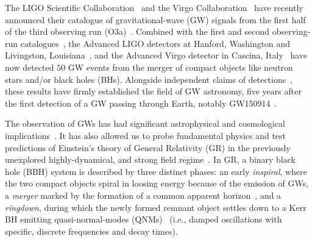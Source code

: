 
The LIGO Scientific Collaboration~\citep{lsc} and the Virgo
Collaboration~\citep{Virgo} have recently announced their catalogue of
gravitational-wave (GW) signals from the first
half of the third observing run (O3a)~\cite{Abbott:2020niy}. Combined
with the first and second observing-run catalogues~\cite{LIGOScientific:2018mvr}, the Advanced LIGO detectors at Hanford,
Washington and Livingston, Louisiana~\citep{aasi2015characterization},
and the Advanced Virgo detector in Cascina,
Italy~\citep{acernese2014advanced} have now detected $50$ GW
events from the merger of compact objects like neutron stars and/or
black holes (BHs). Alongside independent claims of
detections~\citep{nitz20191,nitz20202,2019PhRvD.100b3007Z,2020PhRvD.101h3030V,Venumadhav_2020}, these results have firmly established the field of GW astronomy, five years after the first detection of a GW passing through Earth, notably GW150914~\citep{abbott2016observation}.

The observation of GWs has had significant astrophysical and cosmological
implications~\citep{LSC_2016astroph,gw170817_mma,gw170817_joint,gw170817_hubble}. It
has also allowed us to probe fundamental
physics and test predictions of Einstein's theory of General Relativity
(GR) in the previously unexplored highly-dynamical, and strong field
regime~\citep{LSC_2016grtests,GW170817_TGR,gwtc1_tgr}. In GR, a binary black hole (BBH) system is described by
three distinct phases: an early \textit{inspiral}, where the two
compact objects spiral in loosing energy because of the emission of GWs, a \textit{merger} marked by the
formation of a common apparent horizon~\citep{NRpaper}, and a \textit{ringdown}, during which the newly formed remnant object settles down to a Kerr BH emitting quasi-normal-modes (QNMs)~\citep{vishu,earlyqnmpapers} (i.e., damped oscillations with specific, discrete frequencies and decay times).

